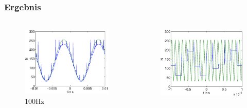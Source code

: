 \begin{frame}
    \frametitle{Ergebnis}
    \framesubtitle{}
    \begin{columns}[c]
             \begin{figure}[H]
             \begin{center}
                     \includegraphics[scale=0.3]{./img/graph/Aufgabe3_100hz_N.eps}
             \end{center}
             \caption{100Hz}
             \end{figure}
             \begin{figure}[H]
             \begin{center}
                     \includegraphics[scale=0.3]{./img/graph/Aufgabe3_10khz_N.eps}

\end{center}
\end{figure}
\end{columns}
\end{frame}
